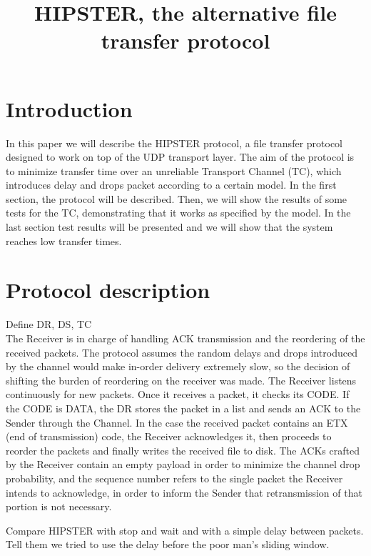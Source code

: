 \documentclass[10pt,twocolumn]{article}
\begin{document}
\title{HIPSTER, the alternative file transfer protocol}
\author{}
\date{}
\maketitle

\section{Introduction}
In this paper we will describe the HIPSTER protocol, a file transfer protocol designed to work on top of the UDP transport layer. The aim of the protocol is to minimize transfer time over an unreliable Transport Channel (TC), which introduces delay and drops packet according to a certain model. In the first section, the protocol will be described. Then, we will show the results of some tests for the TC, demonstrating that it works as specified by the model. In the last section test results will be presented and we will show that the system reaches low transfer times.

\section{Protocol description}

Define DR, DS, TC\\

The Receiver is in charge of handling ACK transmission and the reordering of the received packets. The protocol assumes the random delays and drops introduced by the channel would make in-order delivery extremely slow, so the decision of shifting the burden of reordering on the receiver was made. The Receiver listens continuously for new packets. Once it receives a packet, it checks its CODE. If the CODE is DATA, the DR stores the packet in a list and sends an ACK to the Sender through the Channel. In the case the received packet contains an ETX (end of transmission) code, the Receiver acknowledges it, then proceeds to reorder the packets and finally writes the received file to disk. The ACKs crafted by the Receiver contain an empty payload in order to minimize the channel drop probability, and the sequence number refers to the single packet the Receiver intends to acknowledge, in order to inform the Sender that retransmission of that portion is not necessary.

Compare HIPSTER with stop and wait and with a simple delay between packets.\\
Tell them we tried to use the delay before the poor man's sliding window.
\end{document}

